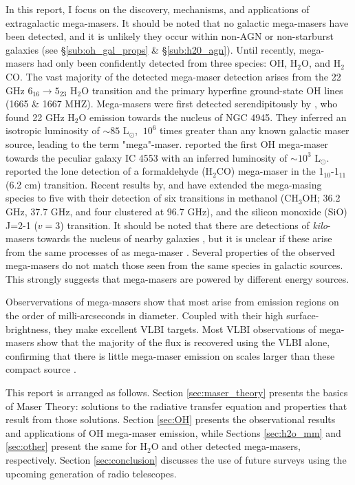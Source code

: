 In this report, I focus on the discovery, mechanisms, and applications of extragalactic mega-masers. It should be noted that no galactic mega-masers have been detected, and it is unlikely they occur within non-AGN or non-starburst galaxies (see \S\ref{sub:oh_gal_props} \& \S\ref{sub:h20_agn}). Until recently, mega-masers had only been confidently detected from three species: OH, H$_2$O, and H$_2$CO. The vast majority of the detected mega-maser detection arises from the 22 GHz $6_{16} \longrightarrow 5_{23}$ H$_2$O transition and the primary hyperfine ground-state OH lines (1665 \& 1667 MHZ). Mega-masers were first detected serendipitously by \citet{DOS_SANTOS_1979}, who found 22 GHz H$_2$O emission towards the nucleus of NGC 4945. They inferred an isotropic luminosity of $\sim 85$ L$_{\odot}$, $~10^6$ times greater than any known galactic maser source, leading to the term "mega"-maser. \citet{Baan_1982} reported the first OH mega-maser towards the peculiar galaxy IC 4553 with an inferred luminosity of $\sim10^3$ L$_{\odot}$. \citet{baan1986} reported the lone detection of a formaldehyde (H$_2$CO) mega-maser in the 1$_{10}$-1$_{11}$ (6.2 cm) transition. Recent results by, \citet{wang2014} and \citet{chen2015} have extended the mega-masing species to five with their detection of six transitions in methanol (CH$_3$OH; 36.2 GHz, 37.7 GHz, and four clustered at 96.7 GHz), and the silicon monoxide (SiO) J=2-1  ($v=3$) transition. It should be noted that there are detections of {\it kilo}-masers towards the nucleus of nearby galaxies \citep[e.g.,]{Ho_1987}, but it is unclear if these arise from the same processes of as mega-maser \citep{lo2005}. Several properties of the observed mega-masers do not match those seen from the same species in galactic sources. This strongly suggests that mega-masers are powered by different energy sources.

Observervations of mega-masers show that most arise from emission regions on the order of milli-arcseconds in diameter. Coupled with their high surface-brightness, they make excellent VLBI targets. Most VLBI observations of mega-masers show that the majority of the flux is recovered using the VLBI alone, confirming that there is little mega-maser emission on scales larger than these compact source \citep{lo2005}.

This report is arranged as follows. Section \ref{sec:maser_theory} presents the basics of Maser Theory: solutions to the radiative transfer equation and properties that result from those solutions. Section \ref{sec:OH} presents the observational results and applications of OH mega-maser emission, while Sections \ref{sec:h2o_mm} and \ref{sec:other} present the same for H$_2$O and other detected mega-masers, respectively. Section \ref{sec:conclusion} discusses the use of future surveys using the upcoming generation of radio telescopes.
